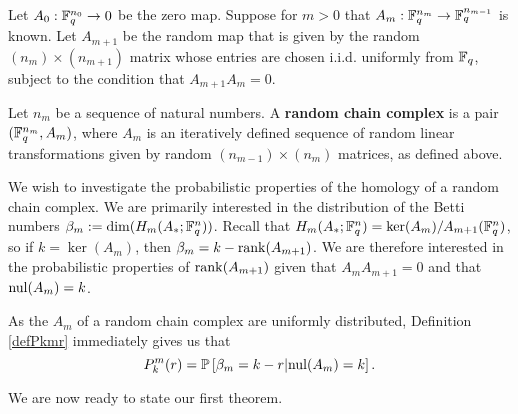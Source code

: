 %

Let $A_0:\mathbb{F}_q^{n_0} \to 0$ be the zero map. Suppose for $m>0$ that
$A_{m}:\mathbb{F}_q^{n_m} \to \mathbb{F}_q^{n_{m-1}}$ is known. Let $A_{m+1}$ be the random map
that is given by the random $(n_{m})\times (n_{m+1})$ matrix whose entries are
chosen i.i.d. uniformly from $\mathbb{F}_q$, subject to the condition that $A_{m+1}A_{m}
= 0$.

\begin{definition} 
  \label{defn:random_chain_cx}
  Let $n_m$ be a sequence of natural numbers. A \textbf{random chain complex}
  is a pair $(\mathbb{F}_q^{n_m},A_m)$, where $A_m$ is an iteratively defined sequence
  of random linear transformations given by random $(n_{m-1})\times (n_m)$
  matrices, as defined above.
\end{definition}

We wish to investigate the probabilistic properties of the homology of a random
chain complex.  We are primarily interested in the distribution of the Betti
numbers $\beta_m := \dim(H_m(A_\ast; \mathbb{F}_q^{n}))$.  Recall that
$H_m(A_\ast;\mathbb{F}_q^{n}) = \ker (A_{m})/ A_{m+1}(\mathbb{F}_q^{n})$, so if $k= \ker(A_m)$,
then $\beta_m = k - \operatorname{\mathrm{rank}}(A_{m+1})$.  We are therefore interested in the
probabilistic properties of $\operatorname{\mathrm{rank}}(A_{m+1})$ given that $A_{m}A_{m+1} = 0$ and
that $\mathrm{nul}(A_{m}) = k$. 


\begin{remark}
As the $A_m$ of a random chain complex are uniformly distributed, Definition
\ref{defPkmr} immediately gives us that
\[
  P^m_k(r) = \mathbb{P}\left[\beta_m = k-r | \mathrm{nul}(A_{m}) = k\right].
\]
\end{remark}



We are now ready to state our first theorem.


